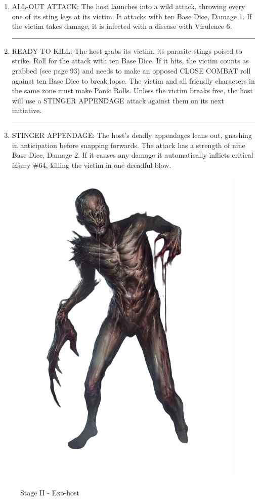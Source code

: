 \begin{rpg-commentbox}{}
\begin{small}
\begin{enumerate}
        \par\noindent\rule{.9\textwidth}{0.4pt}

        \item ALL-OUT ATTACK: The host launches into a wild attack, throwing every one of its sting legs at its victim. It attacks with ten Base Dice, Damage 1. If the victim takes damage, it is infected with a disease with Virulence 6.

        \par\noindent\rule{.9\textwidth}{0.4pt}

        \item READY TO KILL: The host grabs its victim, its parasite stings poised to strike. Roll for the
        attack with ten Base Dice. If it hits, the victim counts as grabbed (see page 93) and needs to
        make an opposed CLOSE COMBAT roll against ten Base Dice to break loose. The victim and all
        friendly characters in the same zone must make Panic Rolls. Unless the victim breaks free,
        the host will use a STINGER APPENDAGE attack against them on its next initiative.

        \par\noindent\rule{.9\textwidth}{0.4pt}


        \item STINGER APPENDAGE: The host's deadly appendages leans out,
        gnashing in anticipation before snapping forwards. The attack has a strength of nine Base
        Dice, Damage 2. If it causes any damage it automatically inflicts critical injury \#64, killing
        the victim in one dreadful blow. 
    \end{enumerate}
    \end{small}

\end{rpg-commentbox}

\begin{figure}
    \centering
    \includegraphics[width=.45\textwidth]{img/stage-II-bg.png}
    \label{fig:stage-2}
    \caption*{Stage II - Exo-host}
\end{figure}